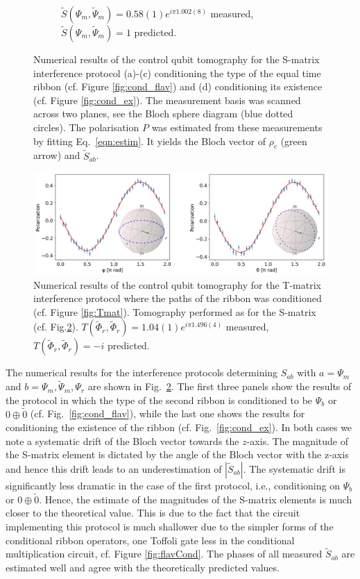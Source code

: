 \documentclass[a4paper,twocolumn,11pt]{quantumarticle}
\begin{document}
\begin{figure}
\begin{subfigure}{\textwidth}
        \caption{$\tilde{S}(\Psi_m, \tilde{\Psi}_m) = 0.58(1)e^{i\pi 1.002(8)}$ measured, $\tilde{S}(\Psi_m, \tilde{\Psi}_m)=1$ predicted.}
        \label{fig:ex_cond_res_zero}
    \end{subfigure}
    \caption{Numerical results of the control qubit tomography for the S-matrix interference protocol (a)-(c) conditioning the type of the equal time ribbon (cf. Figure \ref{fig:cond_flav}) and (d) conditioning its existence (cf. Figure \ref{fig:cond_ex}). The measurement basis was scanned across two planes, see the Bloch sphere diagram (blue dotted circles). The polarisation $P$ was estimated from these measurements by fitting Eq.~\eqref{eqn:estim}. It yields the Bloch vector of $\rho_c$ (green arrow) and $\tilde S_{ab}$.}
    \label{fig:S_res}
\end{figure}
\begin{figure}
    \centering
    \includegraphics[width=\textwidth]{Figures/t_j_minus.pdf}
    \caption{Numerical results of the control qubit tomography for the T-matrix interference protocol where the paths of the ribbon was conditioned (cf. Figure \ref{fig:Tmat}). Tomography performed as for the S-matrix (cf. Fig.\ref{fig:S_res}).  $T(\tilde{\Phi}_r, \tilde{\Phi}_r) = 1.04(1)e^{i\pi 1.496(4)}$ measured, $T(\tilde{\Phi}_r, \tilde{\Phi}_r) = -i$ predicted.}
    \label{fig:t_mat_results}
\end{figure}
The numerical results for the interference protocols determining $S_{ab}$ with $a=\Psi_m$ and $b=\Psi_m,\tilde \Psi_m, \Psi_r$ are shown in Fig.~\ref{fig:S_res}. The first three panels show the results of the protocol in which the type of the second ribbon is conditioned to be $\Psi_b$ or $0 \oplus \tilde 0$ (cf. Fig.~\ref{fig:cond_flav}), while the last one shows the results for conditioning the existence of the ribbon (cf. Fig.~\ref{fig:cond_ex}). In both cases we note a systematic drift of the Bloch vector towards the $z$-axis. The magnitude of the S-matrix element is dictated by the angle of the Bloch vector with the z-axis and hence this drift leads to an underestimation of $|\tilde S_{ab}|$. The systematic drift is significantly less dramatic in the case of the first protocol, i.e., conditioning on $\Psi_b$ or $0 \oplus \tilde 0$.  Hence, the estimate of the magnitudes of the S-matrix elements is much closer to the theoretical value. 
 This is due to the fact that the circuit implementing this protocol is much shallower due to the simpler forms of the conditional ribbon operators, one Toffoli gate less in the conditional multiplication circuit, cf. Figure \ref{fig:flavCond}. The phases of all measured $\tilde S_{ab}$ are estimated well and agree with the theoretically predicted values.
\end{document}
